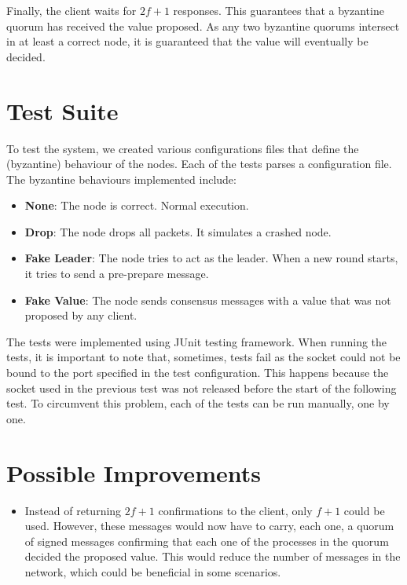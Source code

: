 \documentclass[letterpaper,twocolumn,10pt]{article}
\begin{document}
Finally, the client waits for $2f+1$ responses. This guarantees that a byzantine quorum has received the value proposed. As any two byzantine quorums intersect in at least a correct node, it is guaranteed that the value will eventually be decided.

\section{Test Suite}

To test the system, we created various configurations files that define the (byzantine) behaviour of the nodes. Each of the tests parses a configuration file. The byzantine behaviours implemented include:

\begin{itemize}
    \item \textbf{None}: The node is correct. Normal execution.
    \item \textbf{Drop}: The node drops all packets. It simulates a crashed node.
    \item \textbf{Fake Leader}: The node tries to act as the leader. When a new round starts, it tries to send a pre-prepare message.
    \item \textbf{Fake Value}: The node sends consensus messages with a value that was not proposed by any client.
\end{itemize}

The tests were implemented using JUnit testing framework. When running the tests, it is important to note that, sometimes, tests fail as the socket could not be bound to the port specified in the test configuration. This happens because the socket used in the previous test was not released before the start of the following test. To circumvent this problem, each of the tests can be run manually, one by one.

\section{Possible Improvements}
\begin{itemize}
    \item Instead of returning $2f + 1$ confirmations to the client, only $f + 1$ could be used. However, these messages would now have to carry, each one, a quorum of signed messages confirming that each one of the processes in the quorum decided the proposed value. This would reduce the number of messages in the network, which could be beneficial in some scenarios.
\end{itemize}



\end{document}
